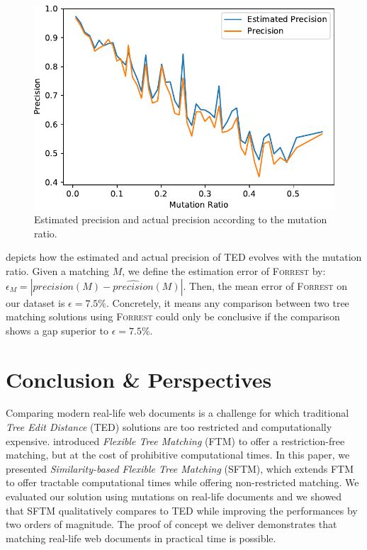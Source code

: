 \documentclass{vldb}
\newcommand{\forrest}[0]{\textsc{Forrest}\xspace}
\begin{document}
\begin{figure}
    \centering
    \includegraphics[width=\linewidth]{graphs/estimated_precision_vs_precision}
    \caption{Estimated precision and actual precision according to the mutation ratio.}
    \label{fig:estimate_vs_real_mutation_ratio}
\end{figure}

 depicts how the estimated and actual precision of TED evolves with the mutation ratio.
Given a matching $M$, we define the estimation error of \forrest by: $\epsilon_M = |precision(M) - \hat{precision}(M)|$.
Then, the mean error of \forrest on our dataset is $\epsilon = 7.5\%$.
Concretely, it means any comparison between two tree matching solutions using \forrest could only be conclusive if the comparison shows a gap superior to $\epsilon = 7.5\%$.


\section{Conclusion \& Perspectives}\label{sec:conclusion}
Comparing modern real-life web documents is a challenge for which traditional \emph{Tree Edit Distance} (TED) solutions are too restricted and computationally expensive. 
\cite{Kumar2011_FTM} introduced \emph{Flexible Tree Matching} (FTM) to offer a restriction-free matching, but at the cost of prohibitive computational times.
In this paper, we presented \emph{Similarity-based Flexible Tree Matching} (SFTM), which extends FTM to offer tractable computational times while offering non-restricted matching.
We evaluated our solution using mutations on real-life documents and we showed that SFTM qualitatively compares to TED while improving the performances by two orders of magnitude.
The proof of concept we deliver demonstrates that matching real-life web documents in practical time is possible.
\end{document}
